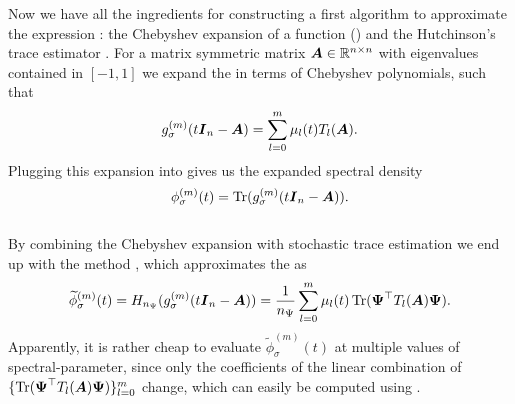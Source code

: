 Now we have all the ingredients for constructing a first algorithm to approximate
the expression :
the Chebyshev expansion of a function ()
and the Hutchinson's trace estimator .
For a matrix symmetric matrix $\boldsymbol{A} \in \mathbb{R}^{n \times n}$ with eigenvalues
contained in $[-1, 1]$
we expand the  in terms of Chebyshev polynomials, such that
\begin{equation}
    g_{\sigma}^{(m)}(t\boldsymbol{I}_n - \boldsymbol{A}) = \sum_{l=0}^{m} \mu_l(t) T_l(\boldsymbol{A}).
    \label{equ:2-chebyshev-chebyshev-expansion}
\end{equation}
Plugging this expansion into 
gives us the expanded spectral density
\begin{equation}
    \phi_{\sigma}^{(m)}(t) = \operatorname{Tr}(g_{\sigma}^{(m)}(t\boldsymbol{I}_n - \boldsymbol{A})).
    \label{equ:2-chebyshev-spectral-density-as-trace-expansion}
\end{equation}\\

By combining the Chebyshev expansion 
with stochastic trace estimation
we end up with the  method \cite[algorithm~2]{lin2017randomized},
which approximates the  as
\begin{equation}
    \widetilde{\phi}_{\sigma}^{(m)}(t) = H_{n_{\Psi}}(g_{\sigma}^{(m)}(t\boldsymbol{I}_n - \boldsymbol{A})) = \frac{1}{n_{\Psi}} \sum_{l=0}^m \mu_l(t) \operatorname{Tr}(\boldsymbol{\Psi}^{\top} T_l(\boldsymbol{A}) \boldsymbol{\Psi}).
    \label{equ:2-chebyshev-DGC-final-estimator}
\end{equation}
Apparently, it is rather cheap to evaluate $\widetilde{\phi}_{\sigma}^{(m)}(t)$
at multiple values of \gls{spectral-parameter}, since only the coefficients
of the linear combination of $\{\operatorname{Tr}(\boldsymbol{\Psi}^{\top} T_l(\boldsymbol{A}) \boldsymbol{\Psi})\}_{l=0}^m$
change, which can easily be computed using .\\

